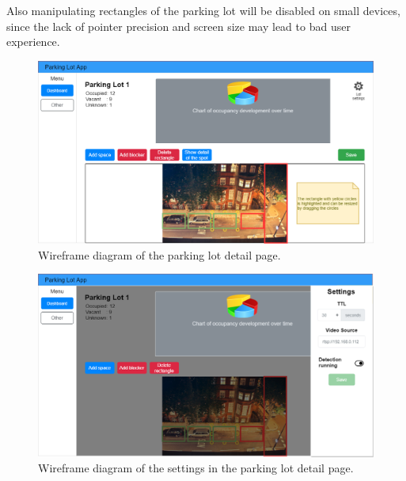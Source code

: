 \documentclass[thesis=M,english]{FITthesis}[2019/03/06]
\begin{document}
Also manipulating rectangles of the parking lot will be disabled on small devices, since the lack of pointer precision and screen size may lead to bad user experience.




\begin{figure}[ht!]
	\centering
	\includegraphics[scale=0.5, angle=90]{imgs/wf-detail.png}
	\caption{Wireframe diagram of the parking lot detail page.}
	\label{label:detail_diagram}
\end{figure}

\begin{figure}[ht!]
	\centering
	\includegraphics[scale=0.5, angle=90]{imgs/wf-settings.png}
	\caption{Wireframe diagram of the settings in the parking lot detail page.}
	\label{label:settings_diagram}
\end{figure}
\end{document}
